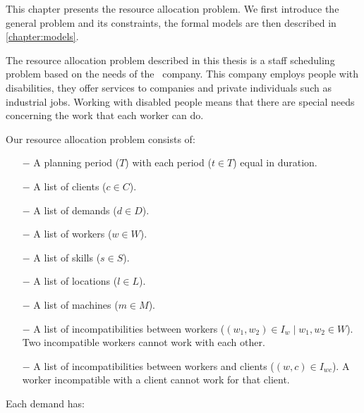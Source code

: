 \documentclass[../thesis.tex]{subfiles}
\begin{document}
This chapter presents the resource allocation problem.
We first introduce the general problem and its constraints, 
the formal models are then described in \autoref{chapter:models}.

The resource allocation problem described in this thesis is a staff scheduling problem based on the needs of the \vone\ company. 
This company employs people with disabilities, they offer services to companies and private individuals such 
as industrial jobs. Working with disabled people means that there are special needs concerning
the work that each worker can do.


Our resource allocation problem consists of:

\begin{itemize}
  \item[$-$] A planning period ($T$) with each period ($t \in T$) equal in duration.
  \item[$-$] A list of clients ($c \in C$). 
  \item[$-$] A list of demands ($d \in D$).
  \item[$-$] A list of workers ($w \in W$). 
  \item[$-$] A list of skills ($s \in S$).
  \item[$-$] A list of locations ($l \in L$).
  \item[$-$] A list of machines ($m \in M$).
  \item[$-$] A list of incompatibilities between workers ($(w_1, w_2) \in I_{w} \mid w_1, w_2 \in W$).
  Two incompatible workers cannot work with each other.  
  \item[$-$] A list of incompatibilities between workers and clients ($(w, c) \in I_{wc}$).
  A worker incompatible with a client cannot work for that client.
\end{itemize}

Each demand has:
\end{document}
